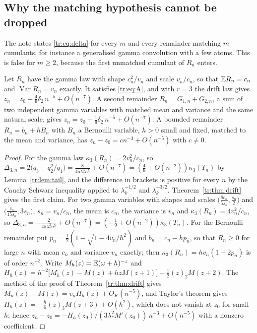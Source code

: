 \subsection{Why the matching hypothesis cannot be dropped}

The note \cite{P26trunc} states \eqref{tr:eq:delta} for every $m$ and every remainder matching $m$ cumulants, for instance a generalised gamma convolution with a few atoms. This is false for $m\ge2$, because the first unmatched cumulant of $R_n$ enters.

\begin{proposition}\label{tr:prop:gamma}
Let $R_n$ have the gamma law with shape $c_n^2/v_n$ and scale $v_n/c_n$, so that $\mathbb{E} R_n=c_n$ and $\operatorname{Var}R_n=v_n$ exactly. It satisfies \eqref{tr:eq:A}, and with $r=3$ the drift law gives $z_n=z_0+\frac49\delta_2\,n^{-5}+O(n^{-7})$. A second remainder $R_n=G_{1,n}+G_{2,n}$, a sum of two independent gamma variables with matched mean and variance and the same natural scale, gives $z_n=z_0-\frac19\delta_2\,n^{-5}+O(n^{-7})$. A bounded remainder $R_n=b_n+hB_n$ with $B_n$ a Bernoulli variable, $h>0$ small and fixed, matched to the mean and variance, has $z_n-z_0=cn^{-3}+O(n^{-5})$ with $c\ne0$.
\end{proposition}

\begin{proof}
For the gamma law $\kappa_3(R_n)=2v_n^2/c_n$, so $\Delta_{3,n}=2\big(q_3-q_2^2/q_1\big)=\frac8{45\lambda_*^3n^5}+O(n^{-7})=(\frac49+O(n^{-2}))\kappa_3(T_n)$ by Lemma~\ref{tr:lem:tail}, and the difference in brackets is positive for every $n$ by the Cauchy Schwarz inequality applied to $\lambda_k^{-1/2}$ and $\lambda_k^{-3/2}$. Theorem~\ref{tr:thm:drift} gives the first claim. For two gamma variables with shapes and scales $\big(\frac{8c_n}{5s_n},\frac{s_n}2\big)$ and $\big(\frac{c_n}{15s_n},3s_n\big)$, $s_n=v_n/c_n$, the mean is $c_n$, the variance is $v_n$ and $\kappa_3(R_n)=4v_n^2/c_n$, so $\Delta_{3,n}=-\frac2{45\lambda_*^3n^5}+O(n^{-7})=(-\frac19+O(n^{-2}))\kappa_3(T_n)$. For the Bernoulli remainder put $p_n=\frac12(1-\sqrt{1-4v_n/h^2})$ and $b_n=c_n-hp_n$, so that $R_n\ge0$ for large $n$ with mean $c_n$ and variance $v_n$ exactly; then $\kappa_3(R_n)=hv_n(1-2p_n)$ is of order $n^{-3}$. Write $M_h(z)=\mathbb{E}(\omega+h)^{-z}$ and $H_h(z)=h^{-2}\big[M_h(z)-M(z)+hzM(z+1)\big]-\frac12(z)_2M(z+2)$. The method of the proof of Theorem~\ref{tr:thm:drift} gives $M_n(z)-M(z)=v_nH_h(z)+O_K(n^{-5})$, and Taylor's theorem gives $H_h(z)=-\frac h6(z)_3M(z+3)+O(h^2)$, which does not vanish at $z_0$ for small $h$; hence $z_n-z_0=-H_h(z_0)/(3\lambda_*^2M'(z_0))\,n^{-3}+O(n^{-5})$ with a nonzero coefficient.
\end{proof}

